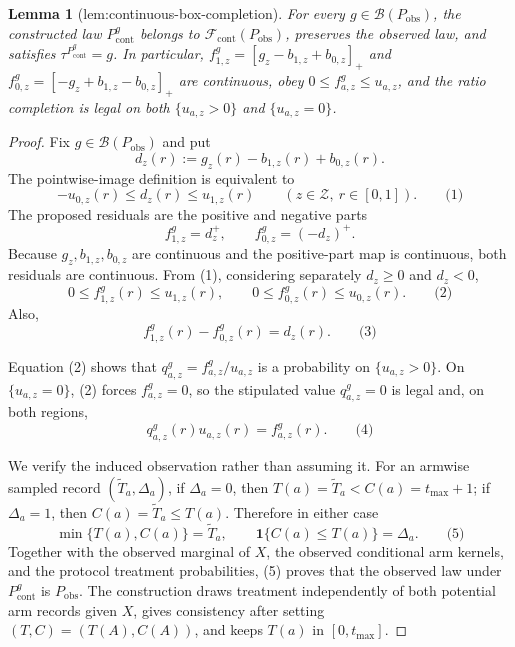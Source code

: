 \documentclass{article}
\newtheorem{lemma}{Lemma}
\begin{document}
\begin{lemma}[lem:continuous-box-completion]\label{lem:continuous-box-completion}
For every \(g\in\mathcal B(P_{\mathrm{obs}})\), the constructed law \(P^g_{\mathrm{cont}}\) belongs to \(\mathcal F_{\mathrm{cont}}(P_{\mathrm{obs}})\), preserves the observed law, and satisfies \(\tau^{P^g_{\mathrm{cont}}}=g\). In particular, \(f^g_{1,z}=[g_z-b_{1,z}+b_{0,z}]_+\) and \(f^g_{0,z}=[-g_z+b_{1,z}-b_{0,z}]_+\) are continuous, obey \(0\le f^g_{a,z}\le u_{a,z}\), and the ratio completion is legal on both \(\{u_{a,z}>0\}\) and \(\{u_{a,z}=0\}\).
\end{lemma}
\begin{proof}
Fix \(g\in\mathcal B(P_{\mathrm{obs}})\) and put
\[
d_z(r):=g_z(r)-b_{1,z}(r)+b_{0,z}(r).
\]
The pointwise-image definition is equivalent to
\[
-u_{0,z}(r)\leq d_z(r)\leq u_{1,z}(r)\qquad(z\in\mathcal Z,\ r\in[0,1]). \qquad\text{(1)}
\]
The proposed residuals are the positive and negative parts
\[
f^g_{1,z}=d_z^+,
\qquad f^g_{0,z}=(-d_z)^+.
\]
Because \(g_z,b_{1,z},b_{0,z}\) are continuous and the positive-part map is continuous, both residuals are continuous.  From (1), considering separately \(d_z\geq0\) and \(d_z<0\),
\[
0\leq f^g_{1,z}(r)\leq u_{1,z}(r),
\qquad
0\leq f^g_{0,z}(r)\leq u_{0,z}(r).                                    \qquad\text{(2)}
\]
Also,
\[
f^g_{1,z}(r)-f^g_{0,z}(r)=d_z(r).                                      \qquad\text{(3)}
\]

Equation (2) shows that \(q^g_{a,z}=f^g_{a,z}/u_{a,z}\) is a probability on \(\{u_{a,z}>0\}\).  On \(\{u_{a,z}=0\}\), (2) forces \(f^g_{a,z}=0\), so the stipulated value \(q^g_{a,z}=0\) is legal and, on both regions,
\[
q^g_{a,z}(r)u_{a,z}(r)=f^g_{a,z}(r).                                   \qquad\text{(4)}
\]

We verify the induced observation rather than assuming it.  For an armwise sampled record \((\widetilde T_a,\Delta_a)\), if \(\Delta_a=0\), then \(T(a)=\widetilde T_a<C(a)=t_{\max}+1\); if \(\Delta_a=1\), then \(C(a)=\widetilde T_a\leq T(a)\).  Therefore in either case
\[
\min\{T(a),C(a)\}=\widetilde T_a,
\qquad \mathbf 1\{C(a)\leq T(a)\}=\Delta_a.                          \qquad\text{(5)}
\]
Together with the observed marginal of \(X\), the observed conditional arm kernels, and the protocol treatment probabilities, (5) proves that the observed law under \(P^g_{\mathrm{cont}}\) is \(P_{\mathrm{obs}}\).  The construction draws treatment independently of both potential arm records given \(X\), gives consistency after setting \((T,C)=(T(A),C(A))\), and keeps \(T(a)\) in \([0,t_{\max}]\).


\end{proof}
\end{document}
